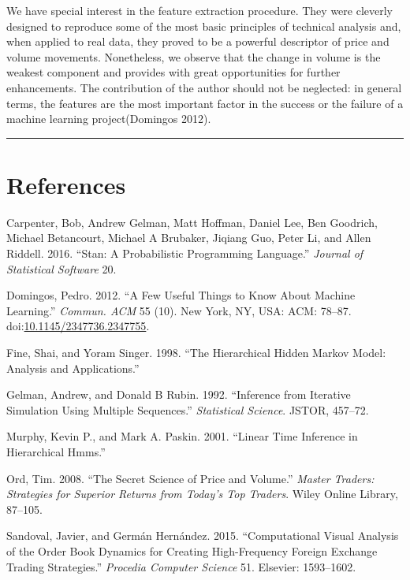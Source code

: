 \documentclass[]{article}
\begin{document}
We have special interest in the feature extraction procedure. They were
cleverly designed to reproduce some of the most basic principles of
technical analysis and, when applied to real data, they proved to be a
powerful descriptor of price and volume movements. Nonetheless, we
observe that the change in volume is the weakest component and provides
with great opportunities for further enhancements. The contribution of
the author should not be neglected: in general terms, the features are
the most important factor in the success or the failure of a machine
learning project(Domingos 2012).

\begin{center}\rule{0.5\linewidth}{\linethickness}\end{center}

\section{References}\label{references}

\hypertarget{refs}{}
\hypertarget{ref-carpenter2016stan}{}
Carpenter, Bob, Andrew Gelman, Matt Hoffman, Daniel Lee, Ben Goodrich,
Michael Betancourt, Michael A Brubaker, Jiqiang Guo, Peter Li, and Allen
Riddell. 2016. ``Stan: A Probabilistic Programming Language.''
\emph{Journal of Statistical Software} 20.

\hypertarget{ref-domingos2012few}{}
Domingos, Pedro. 2012. ``A Few Useful Things to Know About Machine
Learning.'' \emph{Commun. ACM} 55 (10). New York, NY, USA: ACM: 78--87.
doi:\href{https://doi.org/10.1145/2347736.2347755}{10.1145/2347736.2347755}.

\hypertarget{ref-fine1998hierarchical}{}
Fine, Shai, and Yoram Singer. 1998. ``The Hierarchical Hidden Markov
Model: Analysis and Applications.''

\hypertarget{ref-gelman1992inference}{}
Gelman, Andrew, and Donald B Rubin. 1992. ``Inference from Iterative
Simulation Using Multiple Sequences.'' \emph{Statistical Science}.
JSTOR, 457--72.

\hypertarget{ref-murphy2001linear}{}
Murphy, Kevin P., and Mark A. Paskin. 2001. ``Linear Time Inference in
Hierarchical Hmms.''

\hypertarget{ref-ord2008secret}{}
Ord, Tim. 2008. ``The Secret Science of Price and Volume.'' \emph{Master
Traders: Strategies for Superior Returns from Today's Top Traders}.
Wiley Online Library, 87--105.

\hypertarget{ref-sandoval2015computational}{}
Sandoval, Javier, and Germán Hernández. 2015. ``Computational Visual
Analysis of the Order Book Dynamics for Creating High-Frequency Foreign
Exchange Trading Strategies.'' \emph{Procedia Computer Science} 51.
Elsevier: 1593--1602.
\end{document}
